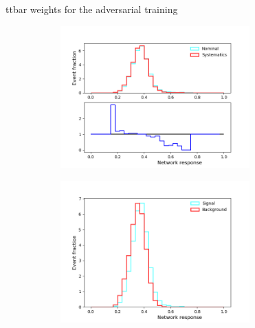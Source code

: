 \documentclass[10pt, UKenglish]{beamer}
\begin{document}
\begin{frame}{ttbar weights for the adversarial training}
    \begin{figure}[htbp]
    \caption{Weight = 0}
    \centering
    \begin{subfigure}[b]{0.47\textwidth}
        \includegraphics[width=0.8\textwidth]{separation_adversaryweight0.png}
        \label{fig:simple:final:sepa}
    \end{subfigure}
\quad
    \begin{subfigure}[b]{0.47\textwidth}
        \includegraphics[width=0.8\textwidth]{separation_discriminatorweight0.png}
        \label{fig:simple:final:syst}
    \end{subfigure}
    \end{figure}
    \vspace{-0.7cm}
    \begin{figure}[htbp]
    \caption{Weight = 1}
    \centering
    \begin{subfigure}[b]{0.47\textwidth}

\end{subfigure}
\end{figure}
\end{frame}
\end{document}
